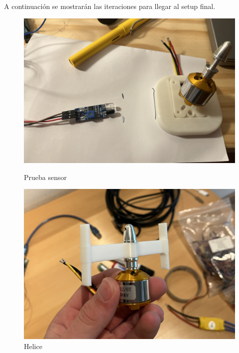 \documentclass{article}
\begin{document}
\newpage
\noindent A continuación se mostrarán las iteraciones para llegar al setup final.

\begin{figure}[H]
    \centering
    \begin{minipage}[c]{0.25\textwidth}
      \centering
      \includegraphics[width=\textwidth]{FOTOS/PS.png}
      \caption{Prueba sensor}
    \end{minipage}
    \begin{minipage}[c]{0.25\textwidth}
      \centering
      \includegraphics[width=\textwidth]{FOTOS/H.png}
      \caption{Helice}
    \end{minipage}
    \begin{minipage}[c]{0.25\textwidth}
      \centering

\end{minipage}
\end{figure}
\end{document}
